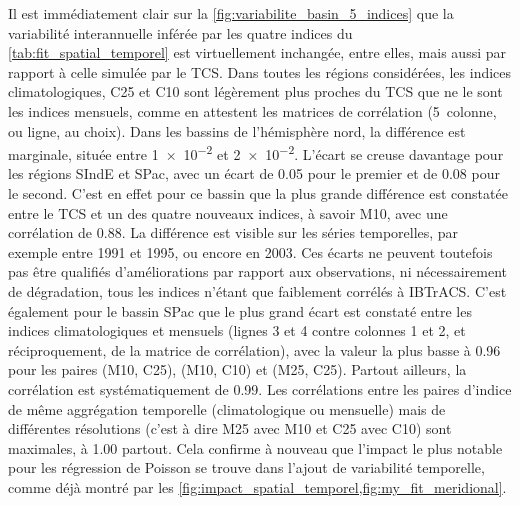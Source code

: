 \documentclass[../main.tex]{subfiles}
\begin{document}
Il est immédiatement clair sur la \cref{fig:variabilite_basin_5_indices} que la variabilité interannuelle inférée par les quatre indices du
\cref{tab:fit_spatial_temporel} est virtuellement inchangée, entre elles, mais aussi par rapport à celle simulée par le TCS. Dans toutes les régions
considérées, les indices climatologiques, C25 et C10 sont légèrement plus proches du TCS que ne le sont les indices mensuels, comme en attestent les matrices de
corrélation (5\ieme~colonne, ou ligne, au choix). Dans les bassins de l'hémisphère nord, la différence est marginale, située entre \num{1e-2} et \num{2e-2}.
L'écart se creuse davantage pour les régions SIndE et SPac, avec un écart de \num{0.05} pour le premier et de \num{0.08} pour le second. C'est en effet pour ce
bassin que la plus grande différence est constatée entre le TCS et un des quatre nouveaux indices, à savoir M10, avec une corrélation de \num{0.88}. La
différence est visible sur les séries temporelles, par exemple entre \num{1991} et \num{1995}, ou encore en \num{2003}. Ces écarts ne peuvent toutefois pas être
qualifiés d'améliorations par rapport aux observations, ni nécessairement de dégradation, tous les indices n'étant que faiblement corrélés à IBTrACS. C'est
également pour le bassin SPac que le plus grand écart est constaté entre les indices climatologiques et mensuels (lignes 3 et 4 contre colonnes 1 et 2, et
réciproquement, de la matrice de corrélation), avec la valeur la plus basse à \num{0.96} pour les paires (M10, C25), (M10, C10) et (M25, C25). Partout ailleurs,
la corrélation est systématiquement de \num{0.99}. Les corrélations entre les paires d'indice de même aggrégation temporelle (climatologique ou mensuelle) mais
de différentes résolutions (c'est à dire M25 avec M10 et C25 avec C10) sont maximales, à \num{1.00} partout. Cela confirme à nouveau que l'impact le plus
notable pour les régression de Poisson se trouve dans l'ajout de variabilité temporelle, comme déjà montré par les
\cref{fig:impact_spatial_temporel,fig:my_fit_meridional}.
\end{document}
